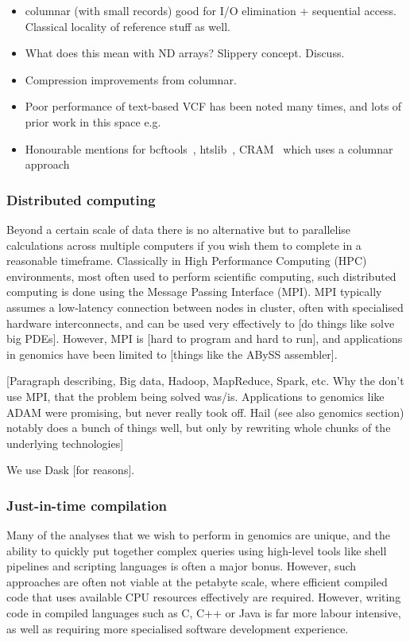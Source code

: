 \documentclass[9pt,lineno]{elife}
\begin{document}
\begin{itemize}
\item columnar (with small records) good for I/O elimination + sequential access.
Classical locality of reference stuff as well.
\item What does this mean with ND arrays? Slippery concept. Discuss.
\item Compression improvements from columnar.
\item Poor performance of text-based VCF has been noted many times,
and lots of prior work in this space e.g. \citep{kelleher2013processing}
\item Honourable mentions for bcftools~\citep{danecek2021twelve},
htslib~\citep{bonfield2021htslib}, CRAM~\citep{bonfield2014scramble,bonfield2022cram}
which uses a columnar approach
\end{itemize}

\subsubsection{Distributed computing}

Beyond a certain scale of data there is no alternative but to
parallelise calculations across multiple computers if you wish
them to complete in a reasonable timeframe. Classically in
High Performance Computing (HPC) environments, most often used
to perform scientific computing, such distributed computing
is done using the Message Passing Interface (MPI). MPI
typically assumes a low-latency connection between nodes in
cluster, often with specialised hardware interconnects,
and can be used very effectively to [do things like solve big PDEs].
However, MPI is [hard to program and hard to run], and applications
in genomics have been limited to [things like the ABySS assembler].

[Paragraph describing, Big data, Hadoop, MapReduce, Spark, etc. Why
the don't use MPI, that the problem being solved was/is.
Applications to genomics like ADAM were promising, but never really
took off. Hail (see also genomics section) notably does a
bunch of things well, but only by rewriting whole chunks of the
underlying technologies]

We use Dask [for reasons].

\subsubsection{Just-in-time compilation}

Many of the analyses that we wish to perform in genomics are unique,
and the ability to quickly put together complex queries using
high-level tools like shell pipelines and scripting languages
is often a major bonus. However, such approaches are often not
viable at the petabyte scale, where efficient compiled code that
uses available CPU resources effectively are required. However,
writing code in compiled languages such as C, C++ or Java
is far more labour intensive, as well as requiring more specialised
software development experience.
\end{document}
